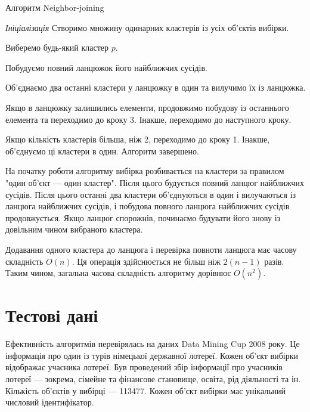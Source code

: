             \begin{algorithm}
                \caption {Алгоритм Neighbor-joining}
                \enumerate
                    \item [ ] \emph{Ініціалізація}
                        Створимо множину одинарних кластерів із усіх об’єктів вибірки.
                     \item
                        Виберемо будь-який кластер $p$.
                     \item
                        Побудуємо повний ланцюжок його найближчих сусідів.
                     \item
                        Об’єднаємо два останні кластери у ланцюжку в один та вилучимо їх із ланцюжка.
                     \item
                        Якщо в ланцюжку залишились елементи, продовжимо побудову із останнього елемента та переходимо до кроку 3. Інакше, переходимо до наступного кроку.
                     \item
                        Якщо кількість кластерів більша, ніж 2, переходимо до кроку 1. Інакше, об’єднуємо ці кластери в один. Алгоритм завершено.                      
            \end{algorithm}
            
            На початку роботи алгоритму вибірка розбивається на кластери за правилом "один об'єкт --- один кластер". Після цього будується повний ланцюг найближчих сусідів. Після цього останні два кластери об'єднуються в один і вилучаються із ланцюга найближчих сусідів, і побудова повного ланцюга найближчих сусідів продовжується. Якщо ланцюг спорожнів, починаємо будувати його знову із довільним чином вибраного кластера.
            
            Додавання одного кластера до ланцюга і перевірка повноти ланцюга має часову складність $O(n)$. Ця операція здійснюється не більш ніж $2(n-1)$ разів. Таким чином, загальна часова складність алгоритму дорівнює $O(n^2)$. 
            
    \section {Тестові дані}
        Ефективність алгоритмів перевірялась на даних Data Mining Cup 2008 року. Це інформація про один із турів німецької державної лотереї. Кожен об'єкт вибірки відображає учасника лотереї. Був проведений збір інформації про учасників лотереї --- зокрема, сімейне та фінансове становище, освіта, рід діяльності та ін. Кількість об'єктів у вибірці --- 113477. Кожен об'єкт вибірки має унікальний числовий ідентифікатор.
        
